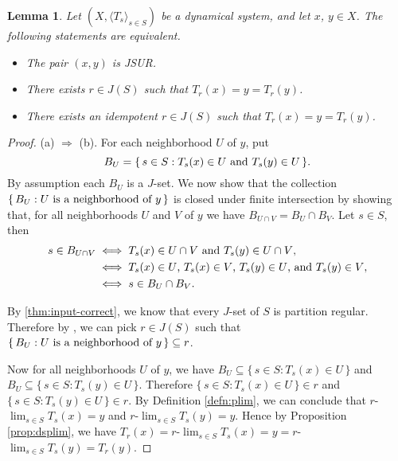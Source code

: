 \documentclass[12pt]{article}
\theoremstyle{plain}
\newtheorem{lem}[thm]{Lemma}
\theoremstyle{definition}
\newcommand{\la}{\langle}
\newcommand{\ra}{\rangle}
\newcommand{\ds}{(X, \la T_s \ra_{s\in S})}
\begin{document}
  \begin{lem}
    \label{lem:JSUR}
    Let $\ds$ be a dynamical system, and let $x$, $y \in X$.
    The following statements are equivalent.
    \begin{itemize}
      \item[(a)] The pair $(x, y)$ is JSUR.
      \item[(b)] There exists $r \in J(S)$ such that $T_r(x) = y = T_r(y)$.
      \item[(c)] There exists an idempotent $r \in J(S)$ such that $T_r(x)
        = y = T_r(y)$. 
    \end{itemize}
  \end{lem}
  \begin{proof}
    (a) $\Rightarrow$ (b). 
    For each neighborhood $U$ of $y$, put 
      \[  
        B_U = \{\, s \in S : \hbox{$T_s(x) \in U$ and $T_s(y) \in U$}
        \,\}.
      \]
    By assumption each $B_U$ is a $J$-set. 
    We now show that the collection $\{\, B_U : \hbox{$U$ is a
      neighborhood of $y$} \,\}$ is closed under finite intersection
    by showing that, for all neighborhoods $U$ and $V$ of $y$ we have $B_{U
      \cap V} = B_U \cap B_V$.
    Let $s \in S$, then 
      \begin{align*}
        s \in B_{U \cap V} &\iff \hbox{$T_s(x) \in U \cap V$ and $T_s(y) \in U
        \cap V$}, \\
      &\iff \hbox{$T_s(x) \in U$, $T_s(x) \in V$, $T_s(y) \in U$, and
        $T_s(y) \in V$}, \\
      &\iff s \in B_U \cap B_V.
      \end{align*}
    
    By \ref{thm:input-correct}, we know that every $J$-set
    of $S$ is partition regular. 
    Therefore by \cite[Theorem 3.11 (b)]{Hindman:1998fk},  we can pick 
    $r \in J(S)$ such that $\{\, B_U : \hbox{$U$ is a neighborhood of
      $y$}\,\} \subseteq r$. 
    
    Now for all neighborhoods $U$ of $y$, we have $B_U \subseteq \{\,
    s \in S : T_s(x) \in U \,\}$ and $B_U \subseteq \{\, s \in S :
    T_s(y) \in U \,\}$. 
    Therefore $\{\, s \in S : T_s(x) \in U\,\} \in r$ and $\{\, s \in
    S : T_s(y) \in U \,\} \in r$. 
    By Definition \ref{defn:plim}, we can conclude that
    $r$-$\displaystyle\lim_{s\in S} T_s(x) = y$ and
    $r$-$\displaystyle\lim_{s \in S} T_s(y) = y$. 
    Hence by Proposition \ref{prop:dsplim}, we have $T_r(x) =
    r$-$\displaystyle\lim_{s \in S} T_s(x) = y = r$-$\displaystyle\lim_{s \in S}
    T_s(y) = T_r(y)$.
  

\end{proof}
\end{document}
